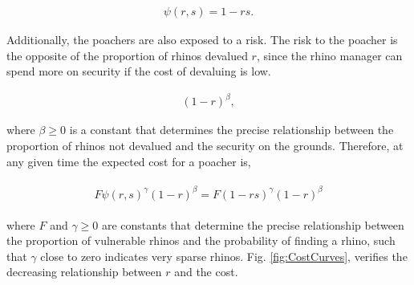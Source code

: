 \documentclass[10pt]{article}
\begin{document}
\begin{eqnarray}
    \label{eqn:psi}
    \psi(r, s) = 1 - rs.
\end{eqnarray}

Additionally, the poachers are also exposed to a risk. The risk to the poacher is
the opposite of the proportion of rhinos devalued \(r\), since the rhino manager
can spend more on security if the cost of devaluing is low.

\begin{eqnarray}
    \label{eqn:risk}
    (1 - r)^{\beta},
\end{eqnarray}

where \(\beta \geq 0\) is a constant that determines the precise relationship between
the proportion of rhinos not devalued and the security on the grounds. Therefore,
at any given time the expected cost for a poacher is, 

\begin{eqnarray}
    \label{eqn:individual_cost}
    \begin{array}{l}
    F \psi(r, s)^{\gamma} (1 - r)^{\beta} = F (1 - rs) ^{\gamma} (1 - r) ^{\beta}
    \end{array}
\end{eqnarray}

where \(F\) and \(\gamma \geq 0\) are constants that determine the precise relationship
between the proportion of vulnerable rhinos and the probability of finding a rhino,
such that \(\gamma\) close to zero indicates very sparse rhinos. Fig.
\ref{fig:CostCurves},  verifies the decreasing relationship between \(r\) and the
cost.
\end{document}
